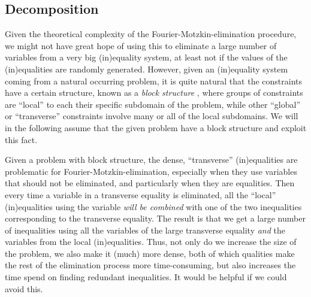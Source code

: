 \subsection{Decomposition}\label{sec:decomp}
Given the theoretical complexity of the Fourier\--Motzkin\--elimination procedure, we might not have great hope of using this to eliminate a large number of variables from a very big (in)equality system, at least not if the values of the (in)equalities are randomly generated.
%
However, given an (in)equality system coming from a natural occurring problem, it is quite natural that the constraints have a certain structure, known as a \emph{block structure} \cite{williams}, where groups of constraints are ``local'' to each their specific subdomain of the problem, %
while other ``global'' or ``transverse'' constraints involve many or all of the local subdomains. We will in the following assume that the given problem have a block structure and exploit this fact. %

Given a problem with block structure, the dense, ``transverse'' (in)equalities are problematic for Fourier-Motzkin-elimination, especially when they use variables that should not be eliminated, and particularly when they are equalities. 
Then every time a variable in a transverse equality is eliminated, all the ``local'' (in)equalities using the variable \emph{will be combined} with one of the two inequalities corresponding to the transverse equality. The result is that we get a large number of inequalities using all the variables of the large transverse equality \emph{and} the variables from the local (in)equalities. Thus, not only do we increase the size of the problem, we also make it (much) more dense, both of which qualities make the rest of the elimination process more time-consuming, but also increases the time spend on finding redundant inequalities.
%
{It would be helpful if we could avoid this.}


